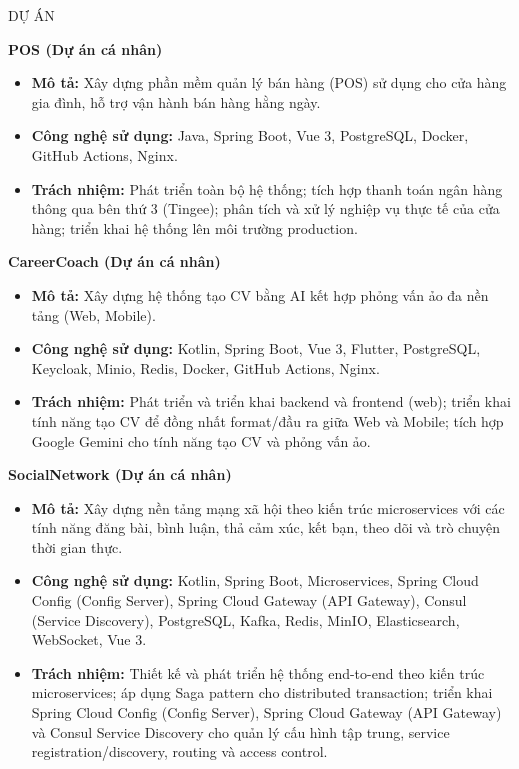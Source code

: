 \documentclass{resume}
\begin{document}
\begin{rSection}{DỰ ÁN}
\begin{samepage}
\item \textbf{POS (Dự án cá nhân)}
\begin{itemize}
    \itemsep -3pt {}
    \item \textbf{Mô tả:} Xây dựng phần mềm quản lý bán hàng (POS) sử dụng cho cửa hàng gia đình, hỗ trợ vận hành bán hàng hằng ngày.
    \item \textbf{Công nghệ sử dụng:} Java, Spring Boot, Vue 3, PostgreSQL, Docker, GitHub Actions, Nginx.
    \item \textbf{Trách nhiệm:} Phát triển toàn bộ hệ thống; tích hợp thanh toán ngân hàng thông qua bên thứ 3 (Tingee); phân tích và xử lý nghiệp vụ thực tế của cửa hàng; triển khai hệ thống lên môi trường production.
\end{itemize}
\end{samepage}

\begin{samepage}
\item \textbf{CareerCoach (Dự án cá nhân)}
\begin{itemize}
    \itemsep -3pt {}
    \item \textbf{Mô tả:} Xây dựng hệ thống tạo CV bằng AI kết hợp phỏng vấn ảo đa nền tảng (Web, Mobile).
    \item \textbf{Công nghệ sử dụng:} Kotlin, Spring Boot, Vue 3, Flutter, PostgreSQL, Keycloak, Minio, Redis, Docker, GitHub Actions, Nginx.
    \item \textbf{Trách nhiệm:} Phát triển và triển khai backend và frontend (web); triển khai tính năng tạo CV để đồng nhất format/đầu ra giữa Web và Mobile; tích hợp Google Gemini cho tính năng tạo CV và phỏng vấn ảo.
\end{itemize}
\end{samepage}

\begin{samepage}
\item \textbf{SocialNetwork (Dự án cá nhân)}
\begin{itemize}
    \itemsep -3pt {}
    \item \textbf{Mô tả:} Xây dựng nền tảng mạng xã hội theo kiến trúc microservices với các tính năng đăng bài, bình luận, thả cảm xúc, kết bạn, theo dõi và trò chuyện thời gian thực.
    \item \textbf{Công nghệ sử dụng:} Kotlin, Spring Boot, Microservices, Spring Cloud Config (Config Server), Spring Cloud Gateway (API Gateway), Consul (Service Discovery), PostgreSQL, Kafka, Redis, MinIO, Elasticsearch, WebSocket, Vue 3.
    \item \textbf{Trách nhiệm:} Thiết kế và phát triển hệ thống end-to-end theo kiến trúc microservices; áp dụng Saga pattern cho distributed transaction; triển khai Spring Cloud Config (Config Server), Spring Cloud Gateway (API Gateway) và Consul Service Discovery cho quản lý cấu hình tập trung, service registration/discovery, routing và access control.
\end{itemize}
\end{samepage}
\end{rSection} 
\end{document}
